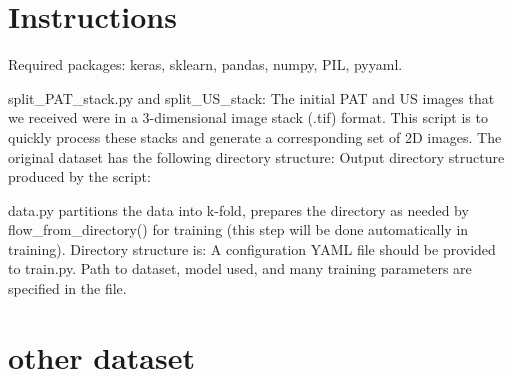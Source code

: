 \chapter{Instructions} %
\label{appendixA}

Required packages: keras, sklearn, pandas, numpy, PIL, pyyaml.

split\_PAT\_stack.py and split\_US\_stack: The initial PAT and US images that we received were in a 3-dimensional image stack (.tif) format. This script is to quickly process these stacks and generate a corresponding set of 2D images.
The original dataset has the following directory structure:
Output directory structure produced by the script:

data.py partitions the data into k-fold, prepares the directory as needed by flow\_from\_directory() for training (this step will be done automatically in training). Directory structure is:
A configuration YAML file should be provided to train.py. Path to dataset, model used, and many training parameters are specified in the file.


\chapter{other dataset}
\label{appendixB}